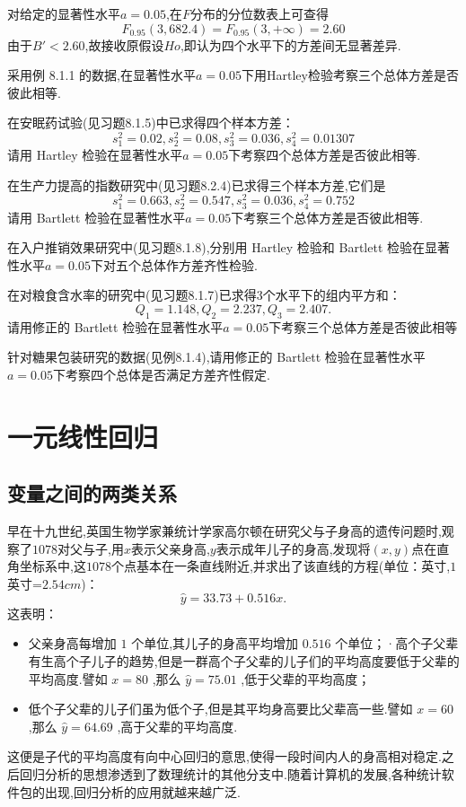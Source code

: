 对给定的显著性水平$ a=0.05 $,在$ F $分布的分位数表上可查得
\[
F_{0.95}(3,682.4)=F_{0.95}(3,+\infty)=2.60
\]
由于$ B'<2.60 $,故接收原假设$ Ho $,即认为四个水平下的方差间无显著差异.
\begin{xiti}
	\item 采用例 8.1.1 的数据,在显著性水平$ a=0.05 $下用Hartley检验考察三个总体方差是否彼此相等.
	\item 在安眠药试验(见习题8.1.5)中已求得四个样本方差：
	\[
	s_1^2=0.02,s_2^2=0.08,s_3^2=0.036,s_4^2=0.01307
	\]
	请用 Hartley 检验在显著性水平$ a=0.05 $下考察四个总体方差是否彼此相等.
	\item 在生产力提高的指数研究中(见习题8.2.4)已求得三个样本方差,它们是
	\[
	s_1^2=0.663,s_2^2=0.547,s_3^2=0.036,s_4^2=0.752
	\]
	请用 Bartlett 检验在显著性水平$ a=0.05 $下考察三个总体方差是否彼此相等.
	\item 在入户推销效果研究中(见习题8.1.8),分别用 Hartley 检验和 Bartlett 检验在显著性水平$ a=0.05 $下对五个总体作方差齐性检验.
	\item 在对粮食含水率的研究中(见习题8.1.7)已求得$ 3 $个水平下的组内平方和：
	\[
	Q_1=1.148,Q_2=2.237,Q_3=2.407.
	\]
	请用修正的 Bartlett 检验在显著性水平$ a=0.05 $下考察三个总体方差是否彼此相等
	\item 针对糖果包装研究的数据(见例8.1.4),请用修正的 Bartlett 检验在显著性水平$ a=
	0.05 $下考察四个总体是否满足方差齐性假定.
\end{xiti}

\section{一元线性回归}\label{sec:8.4}
\subsection{变量之间的两类关系}\label{sub:8.4.1}

早在十九世纪,英国生物学家兼统计学家高尔顿在研究父与子身高的遗传问题时,观察了$ 1078 $对父与子,用$ x $表示父亲身高,$ y $表示成年儿子的身高,发现将$ (x,y) $点在直角坐标系中,这$ 1078 $个点基本在一条直线附近,并求出了该直线的方程(单位：英寸,$ 1 $英寸=$ 2.54cm $)：
\[
\hat{y}=33.73+0.516x.
\]
这表明：
\begin{itemize}
	\item 父亲身高每增加 $ 1 $ 个单位,其儿子的身高平均增加 $ 0.516 $ 个单位；·高个子父辈有生高个子儿子的趋势,但是一群高个子父辈的儿子们的平均高度要低于父辈的平均高度.譬如 $ x=80 $ ,那么 $ \hat{y}=75.01 $ ,低于父辈的平均高度；
	\item 低个子父辈的儿子们虽为低个子,但是其平均身高要比父辈高一些.譬如 $ x=60 $ ,那么 $ \hat{y}=64.69 $ ,高于父辈的平均高度.
\end{itemize}
这便是子代的平均高度有向中心回归的意思,使得一段时间内人的身高相对稳定.之后回归分析的思想渗透到了数理统计的其他分支中.随着计算机的发展,各种统计软件包的出现,回归分析的应用就越来越广泛.

